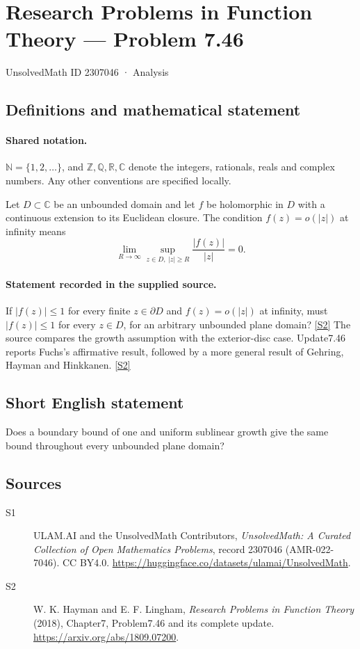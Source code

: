 \documentclass[11pt]{article}
\newcommand{\sref}[2]{\hyperlink{source:#1:#2}{[S#2]}}
\begin{document}
\setcounter{section}{2307045}
\section{Research Problems in Function Theory — Problem 7.46}\label{2307046}
{\small\sffamily UnsolvedMath ID 2307046 · Analysis}
\subsection{Definitions and mathematical statement}

\paragraph{Shared notation.}$\mathbb N=\{1,2,\ldots\}$, and $\mathbb Z,\mathbb Q,\mathbb R,\mathbb C$ denote the integers, rationals, reals and complex numbers. Any other conventions are specified locally.


Let $D\subset\mathbb C$ be an unbounded domain and let $f$ be holomorphic in $D$ with a continuous extension to its Euclidean closure. The condition $f(z)=o(|z|)$ at infinity means
\[\lim_{R\to\infty}\sup_{z\in D,\ |z|\ge R}\frac{|f(z)|}{|z|}=0.\]

\paragraph{Statement recorded in the supplied source.}
If $|f(z)|\le1$ for every finite $z\in\partial D$ and $f(z)=o(|z|)$ at infinity, must $|f(z)|\le1$ for every $z\in D$, for an arbitrary unbounded plane domain? \sref{2307046}{2}
The source compares the growth assumption with the exterior-disc case. Update7.46 reports Fuchs's affirmative result, followed by a more general result of Gehring, Hayman and Hinkkanen. \sref{2307046}{2}
\subsection{Short English statement}
Does a boundary bound of one and uniform sublinear growth give the same bound throughout every unbounded plane domain?
\subsection{Sources}
\begin{description}
\item[\hypertarget{source:2307046:1}{S1}] ULAM.AI and the UnsolvedMath Contributors, \emph{UnsolvedMath: A Curated Collection of Open Mathematics Problems}, record 2307046 (AMR-022-7046). CC BY4.0. \url{https://huggingface.co/datasets/ulamai/UnsolvedMath}.
\item[\hypertarget{source:2307046:2}{S2}] W. K. Hayman and E. F. Lingham, \emph{Research Problems in Function Theory} (2018), Chapter7, Problem7.46 and its complete update. \url{https://arxiv.org/abs/1809.07200}.
\end{description}
\label{end:2307046}
\end{document}
